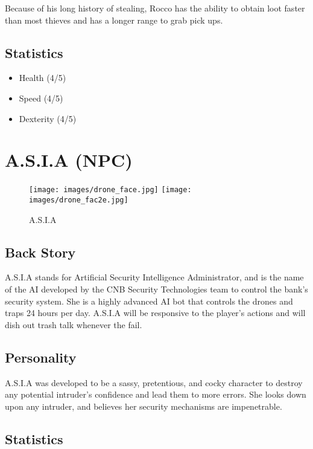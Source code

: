 \documentclass[10pt]{report}
\begin{document}
\begin{multicols}{2}
    Because of his long history of stealing, Rocco has the ability to obtain loot faster than most thieves and has a longer range to grab pick ups.
    
    \subsection{Statistics}
    \begin{itemize}
        \item Health (4/5)
        \item Speed (4/5)
        \item Dexterity (4/5)
    \end{itemize}
\end{multicols}

\pagebreak

\section{A.S.I.A (NPC)}

\begin{figure}[H]
    \centering
    \texttt{[image: images/drone\_face.jpg]}
    \texttt{[image: images/drone\_fac2e.jpg]}
    \caption{A.S.I.A}
\end{figure}

\subsection{Back Story}

A.S.I.A stands for Artificial Security Intelligence Administrator, and is the name of the AI developed by the CNB Security Technologies team to control the bank’s security system. She is a highly advanced AI bot that controls the drones and traps 24 hours per day. A.S.I.A will be responsive to the player’s actions and will dish out trash talk whenever the fail.

\subsection{Personality}

A.S.I.A was developed to be a sassy, pretentious, and cocky character to destroy any potential intruder’s confidence and lead them to more errors. She looks down upon any intruder, and believes her security mechanisms are impenetrable.

\subsection{Statistics}
\end{document}
